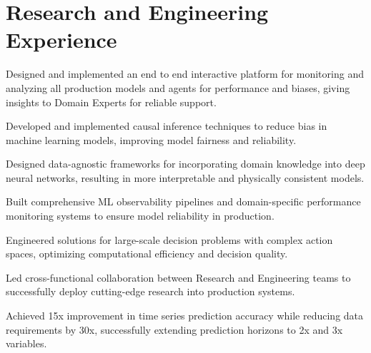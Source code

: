 \documentclass[]{raahul_singh_resume}
\begin{document}
\begin{minipage}[t]{0.66\textwidth} 

\section{Research and Engineering Experience}
\vspace{\topsep}
\begin{tightemize}
        \item {Designed and implemented an end to end interactive platform for monitoring and analyzing all production models and agents for performance and biases, giving insights to Domain Experts for reliable support.}
        \item {Developed and implemented causal inference techniques to reduce bias in machine learning models, improving model fairness and reliability.}
        \item {Designed data-agnostic frameworks for incorporating domain knowledge into deep neural networks, resulting in more interpretable and physically consistent models.}
        \item {Built comprehensive ML observability pipelines and domain-specific performance monitoring systems to ensure model reliability in production.}
        \item {Engineered solutions for large-scale decision problems with complex action spaces, optimizing computational efficiency and decision quality.}
        \item {Led cross-functional collaboration between Research and Engineering teams to successfully deploy cutting-edge research into production systems.}
        \item {Achieved 15x improvement in time series prediction accuracy while reducing data requirements by 30x, successfully extending prediction horizons to 2x and 3x variables.}
\end{tightemize}
\sectionsep

\sectionsep


\end{minipage}
\end{document}

